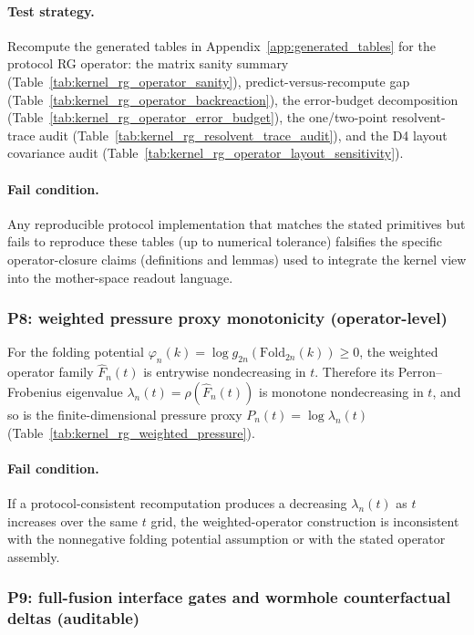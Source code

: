 \paragraph{Test strategy.}
Recompute the generated tables in Appendix~\ref{app:generated_tables} for the protocol RG operator: the matrix sanity summary (Table~\ref{tab:kernel_rg_operator_sanity}), predict-versus-recompute gap (Table~\ref{tab:kernel_rg_operator_backreaction}), the error-budget decomposition (Table~\ref{tab:kernel_rg_operator_error_budget}), the one/two-point resolvent-trace audit (Table~\ref{tab:kernel_rg_resolvent_trace_audit}), and the D4 layout covariance audit (Table~\ref{tab:kernel_rg_operator_layout_sensitivity}).

\paragraph{Fail condition.}
Any reproducible protocol implementation that matches the stated primitives but fails to reproduce these tables (up to numerical tolerance) falsifies the specific operator-closure claims (definitions and lemmas) used to integrate the kernel view into the mother-space readout language.

\subsubsection{P8: weighted pressure proxy monotonicity (operator-level)}
\label{subsec:p8_weighted_pressure_monotonicity}

For the folding potential $\varphi_n(k)=\log g_{2n}(\mathrm{Fold}_{2n}(k))\ge 0$, the weighted operator family $\widehat F_n(t)$ is entrywise nondecreasing in $t$.
Therefore its Perron--Frobenius eigenvalue $\lambda_n(t)=\rho(\widehat F_n(t))$ is monotone nondecreasing in $t$, and so is the finite-dimensional pressure proxy $P_n(t)=\log\lambda_n(t)$ (Table~\ref{tab:kernel_rg_weighted_pressure}).

\paragraph{Fail condition.}
If a protocol-consistent recomputation produces a decreasing $\lambda_n(t)$ as $t$ increases over the same $t$ grid, the weighted-operator construction is inconsistent with the nonnegative folding potential assumption or with the stated operator assembly.

\subsubsection{P9: full-fusion interface gates and wormhole counterfactual deltas (auditable)}
\label{subsec:p9_full_fusion_interface_gates}

